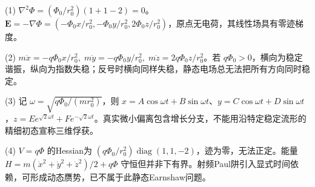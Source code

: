 (1) \(\nabla^2\Phi=(\Phi_0/r_0^2)(1+1-2)=0\)。\(\mathbf E=-\nabla\Phi=(-\Phi_0 x/r_0^2,-\Phi_0 y/r_0^2,2\Phi_0 z/r_0^2)\)，原点无电荷，其线性场具有零迹梯度。

(2) \(m\ddot x=-q\Phi_0x/r_0^2,\;m\ddot y=-q\Phi_0 y/r_0^2,\;m\ddot z=2q\Phi_0z/r_0^2\)。若 \(q\Phi_0>0\)，横向为稳定谐振，纵向为指数失稳；反号时横向同样失稳，静态电场总无法把所有方向同时稳定。

(3) 记 \(\omega=\sqrt{q\Phi_0/(mr_0^2)}\)，则 \(x=A\cos\omega t+B\sin\omega t\)、\(y=C\cos\omega t+D\sin\omega t\)，\(z=E e^{\sqrt2\omega t}+F e^{-\sqrt2\omega t}\)。真实微小偏离包含增长分支，不能用沿特定稳定流形的精细初态宣称三维俘获。

(4) \(V=q\Phi\) 的Hessian为 \((q\Phi_0/r_0^2)\operatorname{diag}(1,1,-2)\)，迹为零，无法正定。能量 \(H=m(\dot x^2+\dot y^2+\dot z^2)/2+q\Phi\) 守恒但并非下有界。射频Paul阱引入显式时间依赖，可形成动态赝势，已不属于此静态Earnshaw问题。
